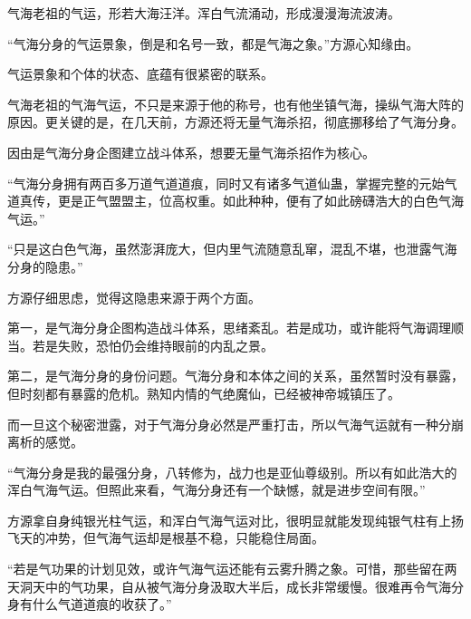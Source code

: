 \begin{this_body}
气海老祖的气运，形若大海汪洋。浑白气流涌动，形成漫漫海流波涛。

“气海分身的气运景象，倒是和名号一致，都是气海之象。”方源心知缘由。

气运景象和个体的状态、底蕴有很紧密的联系。

气海老祖的气海气运，不只是来源于他的称号，也有他坐镇气海，操纵气海大阵的原因。更关键的是，在几天前，方源还将无量气海杀招，彻底挪移给了气海分身。

因由是气海分身企图建立战斗体系，想要无量气海杀招作为核心。

“气海分身拥有两百多万道气道道痕，同时又有诸多气道仙蛊，掌握完整的元始气道真传，更是正气盟盟主，位高权重。如此种种，便有了如此磅礴浩大的白色气海气运。”

“只是这白色气海，虽然澎湃庞大，但内里气流随意乱窜，混乱不堪，也泄露气海分身的隐患。”

方源仔细思虑，觉得这隐患来源于两个方面。

第一，是气海分身企图构造战斗体系，思绪紊乱。若是成功，或许能将气海调理顺当。若是失败，恐怕仍会维持眼前的内乱之景。

第二，是气海分身的身份问题。气海分身和本体之间的关系，虽然暂时没有暴露，但时刻都有暴露的危机。熟知内情的气绝魔仙，已经被神帝城镇压了。

而一旦这个秘密泄露，对于气海分身必然是严重打击，所以气海气运就有一种分崩离析的感觉。

“气海分身是我的最强分身，八转修为，战力也是亚仙尊级别。所以有如此浩大的浑白气海气运。但照此来看，气海分身还有一个缺憾，就是进步空间有限。”

方源拿自身纯银光柱气运，和浑白气海气运对比，很明显就能发现纯银气柱有上扬飞天的冲势，但气海气运却是根基不稳，只能稳住局面。

“若是气功果的计划见效，或许气海气运还能有云雾升腾之象。可惜，那些留在两天洞天中的气功果，自从被气海分身汲取大半后，成长非常缓慢。很难再令气海分身有什么气道道痕的收获了。”

\end{this_body}

